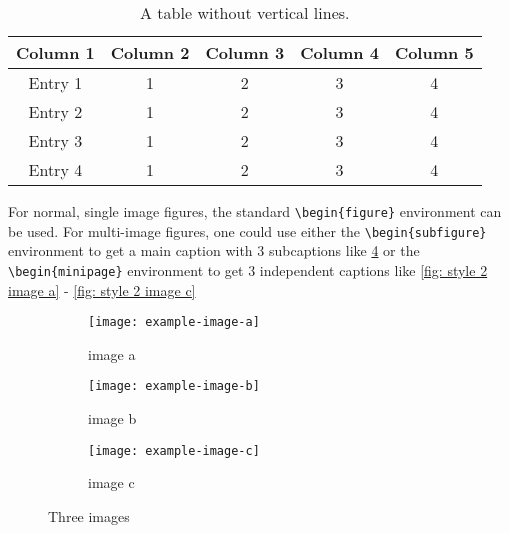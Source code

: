 \begin{table}[ht]
	\centering
	\caption{A table without vertical lines.}
	\begin{tabular}[t]{ccccc}
		\toprule
		\textbf{Column 1} & \textbf{Column 2} & \textbf{Column 3} & \textbf{Column 4} & \textbf{Column 5} \\
		\midrule
		Entry 1           & 1                 & 2                 & 3                 & 4                 \\
		Entry 2           & 1                 & 2                 & 3                 & 4                 \\
		Entry 3           & 1                 & 2                 & 3                 & 4                 \\
		Entry 4           & 1                 & 2                 & 3                 & 4                 \\
		\bottomrule
	\end{tabular}
	\label{table: style 2}
\end{table}

For normal, single image figures, the standard \texttt{\textbackslash begin\{figure\}} environment can be used. For multi-image figures, one could use either the \texttt{\textbackslash begin\{subfigure\}} environment to get a main caption with 3 subcaptions like \cref{fig: three images} or the \texttt{\textbackslash begin\{minipage\}} environment to get 3 independent captions like \cref{fig: style 2 image a} - \ref{fig: style 2 image c}

\begin{figure}[H]
	\centering
	\begin{subfigure}[b]{0.3\textwidth}
		\centering
		\texttt{[image: example-image-a]}
		\caption{image a}
		\label{fig: style 1 image a}
	\end{subfigure}
	\hfill
	\begin{subfigure}[b]{0.3\textwidth}
		\centering
		\texttt{[image: example-image-b]}
		\caption{image b}
		\label{fig: style 1 image b}
	\end{subfigure}
	\hfill
	\begin{subfigure}[b]{0.3\textwidth}
		\centering
		\texttt{[image: example-image-c]}
		\caption{image c}
		\label{fig: style 1 image c}
	\end{subfigure}
	\caption{Three images}
	\label{fig: three images}
\end{figure}

